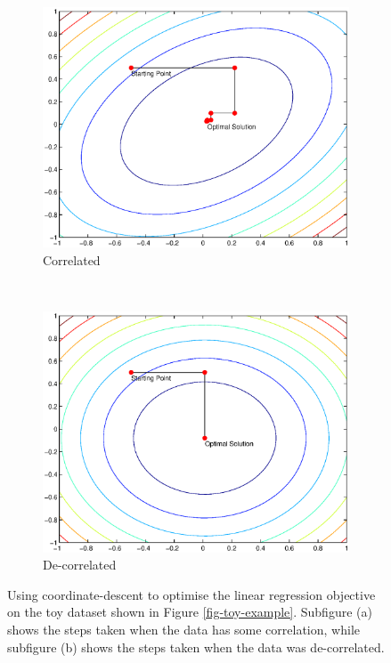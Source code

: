 \documentclass[useAMS,usenatbib,fleqn]{mn2e}
\begin{document}
\begin{figure}
        \centering
        \begin{subfigure}[b]{0.45\columnwidth}
                 \includegraphics[width=\textwidth]{figures/correlated.eps}
                 \caption{Correlated}
        \end{subfigure}
        ~
        \begin{subfigure}[b]{0.45\columnwidth}
                 \includegraphics[width=\textwidth]{figures/decorrelated.eps}
                 \caption{De-correlated}
        \end{subfigure}
       \caption{Using coordinate-descent to optimise the linear regression objective on the toy dataset shown in Figure \ref{fig-toy-example}. Subfigure (a) shows the steps taken when the data has some correlation, while subfigure (b) shows the steps taken when the data was de-correlated.}
	\label{fig-error-surface}
\end{figure}
\end{document}

